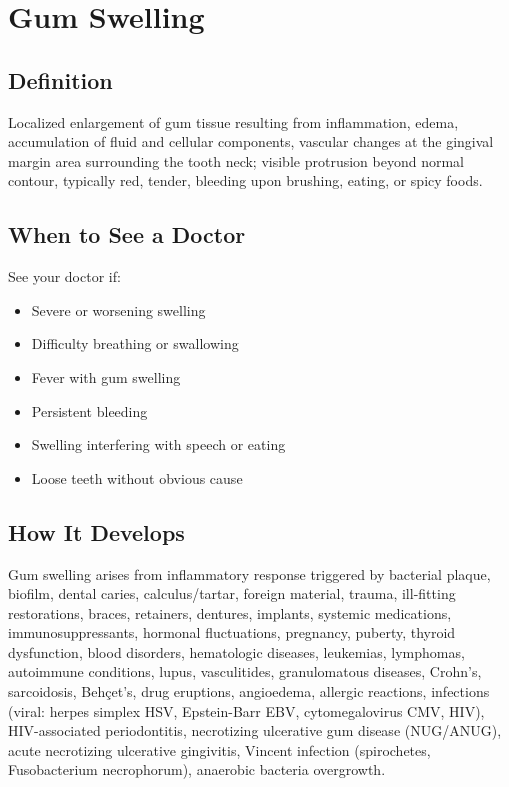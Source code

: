 \chapter{Gum Swelling}

\section*{Definition}
Localized enlargement of gum tissue resulting from inflammation, edema, accumulation of fluid and cellular components, vascular changes at the gingival margin area surrounding the tooth neck; visible protrusion beyond normal contour, typically red, tender, bleeding upon brushing, eating, or spicy foods.

\section*{When to See a Doctor}
See your doctor if:
\begin{itemize}
  \item Severe or worsening swelling
  \item Difficulty breathing or swallowing
  \item Fever with gum swelling
  \item Persistent bleeding
  \item Swelling interfering with speech or eating
  \item Loose teeth without obvious cause
\end{itemize}

\section*{How It Develops}
Gum swelling arises from inflammatory response triggered by bacterial plaque, biofilm, dental caries, calculus/tartar, foreign material, trauma, ill-fitting restorations, braces, retainers, dentures, implants, systemic medications, immunosuppressants, hormonal fluctuations, pregnancy, puberty, thyroid dysfunction, blood disorders, hematologic diseases, leukemias, lymphomas, autoimmune conditions, lupus, vasculitides, granulomatous diseases, Crohn's, sarcoidosis, Behçet's, drug eruptions, angioedema, allergic reactions, infections (viral: herpes simplex HSV, Epstein-Barr EBV, cytomegalovirus CMV, HIV), HIV-associated periodontitis, necrotizing ulcerative gum disease (NUG/ANUG), acute necrotizing ulcerative gingivitis, Vincent infection (spirochetes, Fusobacterium necrophorum), anaerobic bacteria overgrowth.

